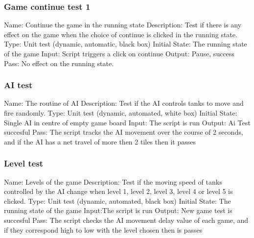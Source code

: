 \documentclass{article}
\begin{document}
\subsubsection{Game continue test 1}
Name:  Continue the game in the running state\newline
Description: Test if there is any effect on the game when the choice of 
continue is clicked in the running state. \newline
Type: Unit test (dynamic, automatic, black box) \newline
Initial State: The running state of the game \newline
Input: Script triggers a click on continue\newline
Output: Pause, success \newline
Pass: No effect on the running state. \newline

\subsubsection{AI test}
Name:  The routine of AI\newline
Description: Test if the AI controls tanks to move and fire randomly. \newline
Type: Unit test (dynamic, automated, white box) \newline
Initial State: Single AI in centre of empty game board \newline
Input: The script is run \newline
Output: Ai Test succesful \newline
Pass: The script tracks the AI movement over the course of 2 seconds,
and if the AI has a net travel of more then 2 tiles then it passes
 \newline

\subsubsection{Level test}
Name:  Levels of the game\newline
Description: Test if the moving speed of tanks controlled by the AI change 
when level 1, level 2, level 3, level 4 or level 5 is clicked. \newline
Type: Unit test (dynamic, automated, black box) \newline
Initial State:  The running state of the game \newline
Input:The script is run\newline
Output: New game test is succesful\newline
Pass: The script checks the AI movement delay value of each game, 
and if they correspond high to low with the level chosen then is passes
 \newline
\end{document}
